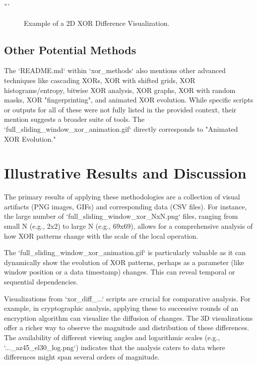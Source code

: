 '''\documentclass[conference]{IEEEtran}
\begin{document}
\begin{figure}[htbp]
    \centering
    \caption{Example of a 2D XOR Difference Visualization.}
    \label{fig:xor_diff_example}
\end{figure}

\subsection{Other Potential Methods}
The `README.md` within `xor_methods` also mentions other advanced techniques like cascading XORs, XOR with shifted grids, XOR histograms/entropy, bitwise XOR analysis, XOR graphs, XOR with random masks, XOR "fingerprinting", and animated XOR evolution. While specific scripts or outputs for all of these were not fully listed in the provided context, their mention suggests a broader suite of tools. The `full_sliding_window_xor_animation.gif` directly corresponds to "Animated XOR Evolution."

\section{Illustrative Results and Discussion} \label{sec:results}
The primary results of applying these methodologies are a collection of visual artifacts (PNG images, GIFs) and corresponding data (CSV files). For instance, the large number of `full_sliding_window_xor_NxN.png` files, ranging from small N (e.g., 2x2) to large N (e.g., 69x69), allows for a comprehensive analysis of how XOR patterns change with the scale of the local operation.

The `full_sliding_window_xor_animation.gif` is particularly valuable as it can dynamically show the evolution of XOR patterns, perhaps as a parameter (like window position or a data timestamp) changes. This can reveal temporal or sequential dependencies.

Visualizations from `xor_diff_...` scripts are crucial for comparative analysis. For example, in cryptographic analysis, applying these to successive rounds of an encryption algorithm can visualize the diffusion of changes. The 3D visualizations offer a richer way to observe the magnitude and distribution of these differences. The availability of different viewing angles and logarithmic scales (e.g., `..._az45_el30_log.png`) indicates that the analysis caters to data where differences might span several orders of magnitude.
\end{document}
